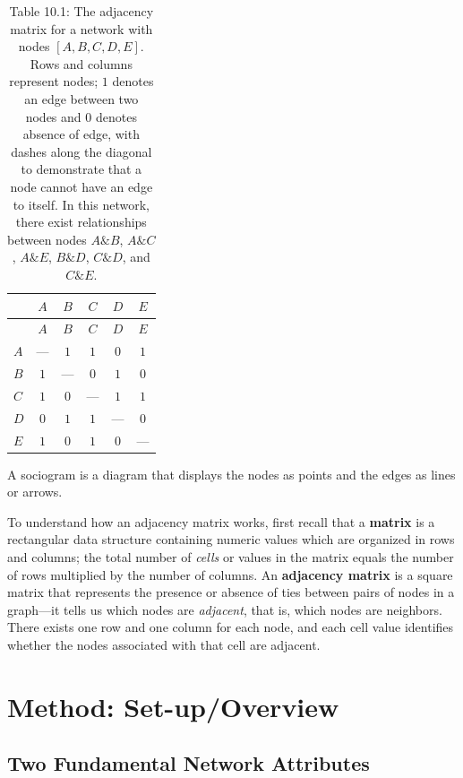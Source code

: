 \documentclass{book}
\begin{document}
\begin{longtable}[]{@{}lccccc@{}}
\caption{Table 10.1: The adjacency matrix for a network with nodes
\([A, B, C, D, E]\). Rows and columns represent nodes; \(1\) denotes an edge
between two nodes and \(0\) denotes absence of edge, with dashes along the
diagonal to demonstrate that a node cannot have an edge to itself. In this
network, there exist relationships between nodes \(A \& B\), \(A \& C\),
\(A \& E\), \(B \& D\), \(C \& D\), and \(C \& E\).}\tabularnewline
\toprule()
& \(A\) & \(B\) & \(C\) & \(D\) & \(E\) \\
\midrule()
\endfirsthead
\toprule()
& \(A\) & \(B\) & \(C\) & \(D\) & \(E\) \\
\midrule()
\endhead
\(A\) & --- & \(1\) & \(1\) & \(0\) & \(1\) \\
\(B\) & \(1\) & --- & \(0\) & \(1\) & \(0\) \\
\(C\) & \(1\) & \(0\) & --- & \(1\) & \(1\) \\
\(D\) & \(0\) & \(1\) & \(1\) & --- & \(0\) \\
\(E\) & \(1\) & \(0\) & \(1\) & \(0\) & --- \\
\bottomrule()
\end{longtable}

A sociogram is a diagram that displays the nodes as points and the edges as
lines or arrows.

To understand how an adjacency matrix works, first recall that a
\textbf{matrix} is a rectangular data structure containing numeric values
which are organized in rows and columns; the total number of \emph{cells} or
values in the matrix equals the number of rows multiplied by the number of
columns. An \textbf{adjacency matrix} is a square matrix that represents the
presence or absence of ties between pairs of nodes in a graph---it tells us
which nodes are \emph{adjacent}, that is, which nodes are neighbors. There
exists one row and one column for each node, and each cell value identifies
whether the nodes associated with that cell are adjacent.

\hypertarget{method-set-upoverview}{%
\section{Method: Set-up/Overview}\label{method-set-upoverview}}

\hypertarget{two-fundamental-network-attributes}{%
\subsection{Two Fundamental Network
Attributes}\label{two-fundamental-network-attributes}}
\end{document}
